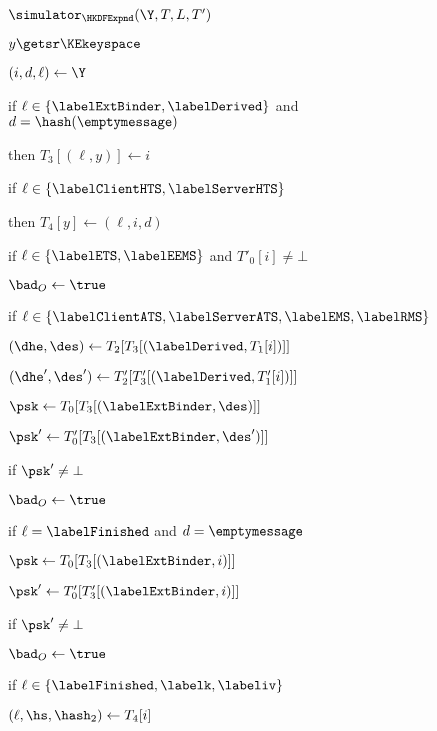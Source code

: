 \begin{figure}[tp]
	\begin{minipage}[t]{0.49\textwidth}
	\ExptSepSpace
	\begin{oracle}{$\simulator_{\HKDFExpnd}(\Y, T, L, T')$}
	\item $y \getsr \KEkeyspace$
	\item $(i, d, \ell) \gets \Y$
	\item if $\ell \in \{\labelExtBinder, \labelDerived\}$ and $d = \hash(\emptymessage)$
	\item \quad then $T_{3}[(\ell,y)] \gets i$
	\item if $\ell \in \{\labelClientHTS, \labelServerHTS\}$
	\item \quad then $T_{4}[y] \gets (\ell, i, d)$
	\item	
	\item if $\ell \in \{\labelETS, \labelEEMS\}$ and $T'_{0}[i] \neq \bot$
	\item \quad {}
	\item \quad \quad $\bad_O \gets \true$
	\item
	\item if $\ell \in \{ \labelClientATS, \labelServerATS,\labelEMS, \labelRMS \}$
	\item \quad $(\dhe, \des) \gets T_2[T_3[(\labelDerived, T_1[i])]]$
	\item \quad $(\dhe', \des') \gets T'_2[T'_3[(\labelDerived, T'_1[i])]]$
	\item \quad $\psk \gets T_0[T_3[(\labelExtBinder, \des)]]$
	\item \quad $\psk' \gets T'_0[T_3[(\labelExtBinder, \des')]]$
	\item \quad if $\psk' \neq \bot$ 
	\item \quad \quad \quad $\bad_O \gets \true$
	\item
	\item if $\ell = \labelFinished$ and $d = \emptymessage$ 
	\item \quad $\psk \gets T_0[T_3[(\labelExtBinder, i)]]$
	\item \quad $\psk' \gets T'_0[T'_3[(\labelExtBinder, i)]]$
	\item \quad if $\psk' \neq \bot$ 
	\item \quad \quad \quad $\bad_O \gets \true$
	\item 
	\item if $\ell \in \{\labelFinished, \labelk, \labeliv \}$
	\item \quad $(\ell, \hs, \hash_2) \gets T_4[i]$

\end{oracle}
\end{minipage}
\end{figure}
